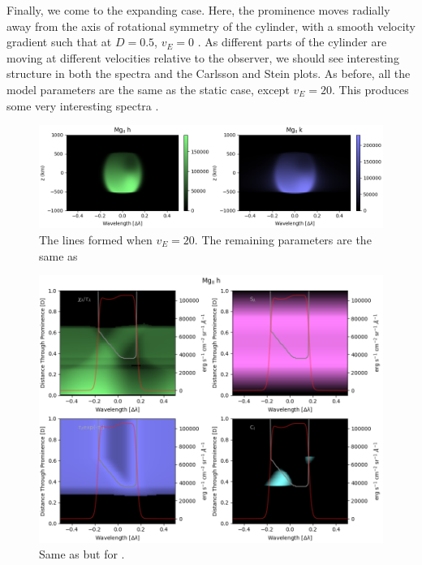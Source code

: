 Finally, we come to the expanding case. Here, the prominence moves radially away from the axis of rotational symmetry of the cylinder, with a smooth velocity gradient such that at $D=0.5$, $v_E=0$ . As different parts of the cylinder are moving at different velocities relative to the observer, we should see interesting structure in both the spectra and the Carlsson and Stein plots. As before, all the model parameters are the same as the static case, except $v_E=20$\kms. This produces some very interesting spectra . 
\begin{figure}
    \centering
    \includegraphics[width=\linewidth]{./03Modelling2D/figs/matplots/mgve20cont.png}
    \caption{The \mgiihk{} lines formed when $v_E=20$\kms. The remaining parameters are the same as }
    \label{ve20c} \vspace{20pt}
\end{figure}
\begin{figure}
    \centering
    \includegraphics[width=0.9\linewidth]{./03Modelling2D/figs/matplots/mghve20.png}
    \caption{Same as  but for .}
    \label{ve20}
\end{figure}
